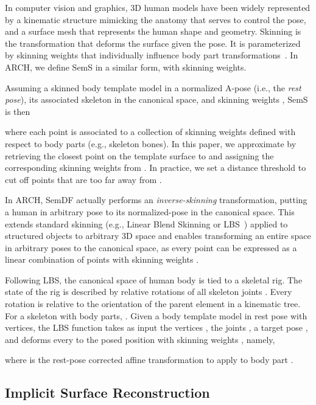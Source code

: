 \documentclass[10pt,twocolumn,letterpaper]{article}
\newcommand{\beforesubsection}{\vspace{0mm}}
\newcommand{\aftersubsection}{\vspace{0mm}}
\begin{document}
In computer vision and graphics, 3D human models have been widely represented by a kinematic structure mimicking the anatomy that serves to control the pose, and a surface mesh that represents the human shape and geometry. Skinning is the transformation that deforms the surface
given the pose. It is parameterized by skinning weights that individually influence body part transformations~\cite{loper2015smpl}.
In ARCH, we define SemS in a similar form, with skinning weights.

Assuming a skinned body template model  in a normalized A-pose (i.e., the \textit{rest pose}), its associated skeleton in the canonical space, and skinning weights , SemS is then

where each point  is associated to a collection of skinning weights  defined with respect to  body parts (e.g., skeleton bones). In this paper, we approximate  by retrieving the closest point  on the template surface to  and assigning the corresponding skinning weights from . In practice, we set a distance threshold to cut off points that are too far away from .

In ARCH, SemDF actually performs an \textit{inverse-skinning} transformation, putting a human in arbitrary pose to its normalized-pose in the canonical space.
This extends standard skinning (e.g., Linear Blend Skinning or LBS~\cite{loper2015smpl}) applied to structured objects to arbitrary 3D space and enables transforming an entire space in arbitrary poses to the canonical space, as every point  can be expressed as a linear combination of points  with skinning weights .

Following LBS, the canonical space of human body is tied to a skeletal rig. The state of the rig is described by relative rotations  of all skeleton joints . Every rotation is relative to the orientation of the parent element in a kinematic tree. For a skeleton with  body parts, .
Given a body template model  in rest pose with  vertices, the LBS function  takes as input the vertices , the joints , a target pose ,
and deforms every  to the posed position  with skinning weights , namely,

where  is the rest-pose corrected affine transformation to apply to body part .


\beforesubsection
\subsection{Implicit Surface Reconstruction} \label{sec:model}
\aftersubsection
\end{document}
